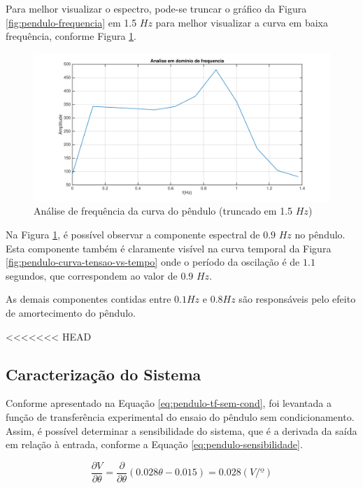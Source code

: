 \documentclass[a4paper]{instrumentacao}
\begin{document}
Para melhor visualizar o espectro, pode-se truncar o gráfico da Figura \ref{fig:pendulo-frequencia} em 1.5 $Hz$ para melhor visualizar a curva em baixa frequência, conforme Figura \ref{fig:pendulo-frequencia-truncado}.

\begin{figure}[H]
\centering
\includegraphics[width=\textwidth]{frequency-plot-slice.pdf}
\caption{Análise de frequência da curva do pêndulo (truncado em 1.5 $Hz$)}
\label{fig:pendulo-frequencia-truncado}
\end{figure}

Na Figura \ref{fig:pendulo-frequencia-truncado}, é possível observar a componente espectral de $0.9$ $Hz$ no pêndulo. Esta componente também é claramente visível na curva temporal da Figura \ref{fig:pendulo-curva-tensao-vs-tempo} onde o período da oscilação é de $1.1$ segundos, que correspondem ao valor de $0.9$ $Hz$.

As demais componentes contidas entre $0.1 Hz$ e $0.8 Hz$ são responsáveis pelo efeito de amortecimento do pêndulo.

<<<<<<< HEAD
\subsection{Caracterização do Sistema}
Conforme apresentado na Equação \ref{eq:pendulo-tf-sem-cond}, foi levantada a função de transferência experimental do ensaio do pêndulo sem condicionamento. Assim, é possível determinar a sensibilidade do sistema, que é a derivada da saída em relação à entrada, conforme a Equação \ref{eq:pendulo-sensibilidade}.

\begin{equation}
	\frac{\partial V}{\partial \theta}=\frac{\partial}{\partial \theta}(0.028\theta-0.015)=0.028(V/º)
	\label{eq:pendulo-sensibilidade}
\end{equation}
\end{document}
